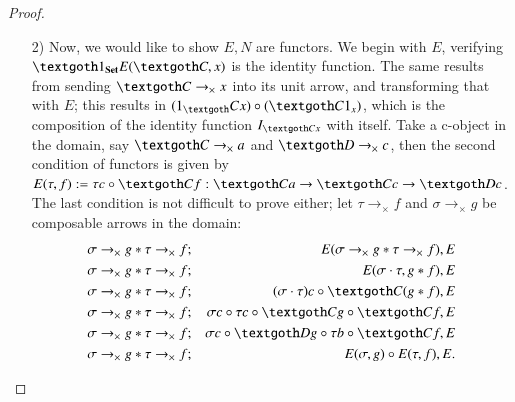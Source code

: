 \documentclass [12pt]{book}
\begin{document}
\begin{proof}
\begin{itemize}
\item[2)]Now, we would like to show $E,N$ are functors. We begin with $E$, verifying $\textgoth1_\textbf{Set}E(\textgoth C,x)$ is the identity function. The same results from sending $\textgoth C\rightarrow_\times x$ into its unit arrow, and transforming that with $E$; this results in $(1_\textgoth Cx)\circ( \textgoth C1_x)$, which is the composition of the identity function $I_{\textgoth Cx}$ with itself. Take a c-object in the domain, say $\textgoth C\rightarrow_\times a$ and $\textgoth D\rightarrow_\times c$, then the second condition of functors is given by $E(\tau,f):=\tau c\circ\textgoth Cf:\textgoth Ca\rightarrow\textgoth Cc\rightarrow\textgoth Dc$. The last condition is not difficult to prove either; let $\tau\rightarrow_\times f$ and $\sigma\rightarrow_\times g$ be composable arrows in the domain:\begin{eqnarray}\nonumber\sigma\rightarrow_\times g*\tau\rightarrow_\times f&;&E(\sigma\rightarrow_\times g*\tau\rightarrow_\times f),E\\\nonumber\sigma\rightarrow_\times g*\tau\rightarrow_\times f&;&E(\sigma\cdot\tau,g*f),E\\\nonumber\sigma\rightarrow_\times g*\tau\rightarrow_\times f&;&(\sigma\cdot\tau)c\circ\textgoth C(g*f),E\\\nonumber\sigma\rightarrow_\times g*\tau\rightarrow_\times f&;&\sigma c\circ\tau c\circ\textgoth Cg\circ\textgoth Cf,E\\\nonumber\sigma\rightarrow_\times g*\tau\rightarrow_\times f&;&\sigma c\circ\textgoth Dg\circ\tau b\circ\textgoth Cf,E\\\nonumber\sigma\rightarrow_\times g*\tau\rightarrow_\times f&;&E(\sigma,g)\circ E(\tau,f),E.\end{eqnarray}


\end{itemize}
\end{proof}
\end{document}
